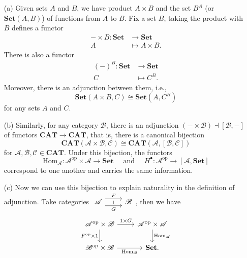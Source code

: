 \begin{remark}
  \begin{enumerate}
    \item[(a)]  Given sets $A$ and $B$, we have product $A\times B$ and the set $B^{A}$ (or $\mathbf{Set}(A,B)$) of functions from $A$ to $B$. Fix a set $B$, taking the product with $B$ defines a functor 
      \begin{align*}
        -\times B: \mathbf{Set} &\longrightarrow \mathbf{Set} \\
        A &\longmapsto A\times B
      .\end{align*}
      There is also a functor
      \begin{align*}
	(-)^{B}: \mathbf{Set} &\longrightarrow \mathbf{Set} \\
        C &\longmapsto C^{B}
      .\end{align*}
Moreover, there is an adjunction between them, i.e.,
      \[
	\mathbf{Set}(A\times B,C)\cong \mathbf{Set}(A,C^{B})
      \] for any sets $A$ and $C$.
    \item[(b)] Similarly, for any category $\mathscr{B}$, there is an adjunction $(-\times \mathscr{B})\dashv [\mathscr{B},-]$ of functors $\mathbf{CAT}\to \mathbf{CAT}$, that is, there is a canonical bijection
      \[
	\mathbf{CAT}\left( \mathscr{A}\times \mathscr{B},\mathscr{C} \right) \cong \mathbf{CAT}\left( \mathscr{A},[\mathscr{B},\mathscr{C}] \right) 
      \] for $\mathscr{A},\mathscr{B},\mathscr{C}\in \mathbf{CAT}$. Under this bijection, the functors
      \[
	\mathrm{Hom}_{\mathscr{A}}:\mathscr{A}^{\mathrm{op}}\times \mathscr{A}\to \mathbf{Set} \quad \text{ and }\quad H^{\bullet}:\mathscr{A}^{\mathrm{op}}\to [\mathscr{A},\mathbf{Set}]
      \] correspond to one another and carries the same information.
    \item[(c)] Now we can use this bijection to explain naturality in the definition of adjunction. Take categories $
  \begin{tikzcd}\mathscr{A}\arrow[r, shift left=2, "F"]  \arrow[r, shift right=2,"\bot", "G"'] &\mathscr{B}
  \end{tikzcd}$, then we have
  \[
  \begin{tikzcd}
    \mathscr{A}^{\mathrm{op}}\times \mathscr{B}\arrow[r,"1\times G"] \arrow[d,"F^{\mathrm{op}}\times 1"'] & \mathscr{A}^{\mathrm{op}}\times \mathscr{A} \arrow[d,"\mathrm{Hom}_{\mathscr{A}}"] \\
    \mathscr{B}^{\mathrm{op}}\times \mathscr{B}\arrow[r,"\mathrm{Hom}_{\mathscr{B}}"'] & \mathbf{Set}.
  \end{tikzcd}
  \] 
  \end{enumerate}
\end{remark}


